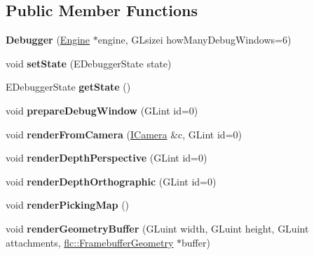\subsection*{Public Member Functions}
\begin{DoxyCompactItemize}
\item 
\mbox{\label{classflw_1_1flf_1_1Debugger_a4570381482b8e0ae6ec20dcda8b86e56}} 
{\bfseries Debugger} (\hyperlink{classflw_1_1Engine}{Engine} $\ast$engine, G\+Lsizei how\+Many\+Debug\+Windows=6)
\item 
\mbox{\label{classflw_1_1flf_1_1Debugger_a6652d6e4987c0cad7eae2c087012eae8}} 
void {\bfseries set\+State} (E\+Debugger\+State state)
\item 
\mbox{\label{classflw_1_1flf_1_1Debugger_ab59fab2b703209885c272afa5a8869f3}} 
E\+Debugger\+State {\bfseries get\+State} ()
\item 
\mbox{\label{classflw_1_1flf_1_1Debugger_a17da1935b9481ac8411d7d213f4aedd1}} 
void {\bfseries prepare\+Debug\+Window} (G\+Lint id=0)
\item 
\mbox{\label{classflw_1_1flf_1_1Debugger_a2e77e7dabf1de62f9bc77d2a7639482d}} 
void {\bfseries render\+From\+Camera} (\hyperlink{classflw_1_1flf_1_1ICamera}{I\+Camera} \&c, G\+Lint id=0)
\item 
\mbox{\label{classflw_1_1flf_1_1Debugger_acce2fb29767c433cf66bd1471165230d}} 
void {\bfseries render\+Depth\+Perspective} (G\+Lint id=0)
\item 
\mbox{\label{classflw_1_1flf_1_1Debugger_ace0a7b5a5a567bb9b10f0c4ed571b62e}} 
void {\bfseries render\+Depth\+Orthographic} (G\+Lint id=0)
\item 
\mbox{\label{classflw_1_1flf_1_1Debugger_a9e591ee479c22a4fcfaf51a85db03975}} 
void {\bfseries render\+Picking\+Map} ()
\item 
\mbox{\label{classflw_1_1flf_1_1Debugger_a874b8a109365ef5252835ee536b0bf1f}} 
void {\bfseries render\+Geometry\+Buffer} (G\+Luint width, G\+Luint height, G\+Luint attachments, \hyperlink{classflw_1_1flc_1_1FramebufferGeometry}{flc\+::\+Framebuffer\+Geometry} $\ast$buffer)
\end{DoxyCompactItemize}
